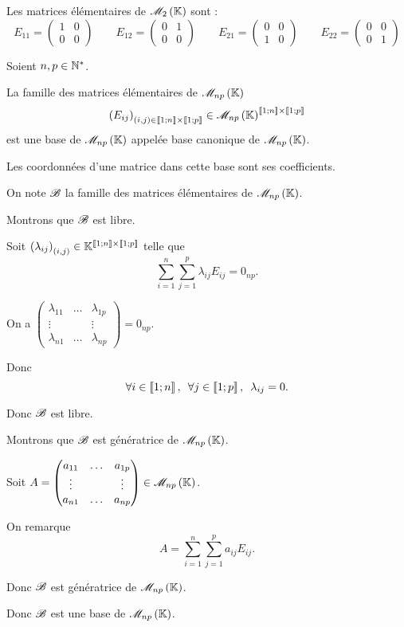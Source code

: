 \begin{ex}
Les matrices élémentaires de \(\M{2}\) sont : \[E_{11}=\begin{pmatrix}
1 & 0 \\
0 & 0
\end{pmatrix}\qquad E_{12}=\begin{pmatrix}
0 & 1 \\
0 & 0
\end{pmatrix}\qquad E_{21}=\begin{pmatrix}
0 & 0 \\
1 & 0
\end{pmatrix}\qquad E_{22}=\begin{pmatrix}
0 & 0 \\
0 & 1
\end{pmatrix}\]
\end{ex}

\begin{prop}
Soient \(n,p\in\mathbb{N}^*\).

La famille des matrices élémentaires de \(\M{np}\) \[\paren{E_{ij}}_{\paren{i,j}\in\interventierii{1}{n}\times\interventierii{1}{p}}\in\M{np}^{\interventierii{1}{n}\times\interventierii{1}{p}}\] est une base de \(\M{np}\) appelée base canonique de \(\M{np}\).

Les coordonnées d'une matrice dans cette base sont ses coefficients.
\end{prop}

\begin{dem}
On note \(\mathscr{B}\) la famille des matrices élémentaires de \(\M{np}\).

Montrons que \(\mathscr{B}\) est libre.

Soit \(\left(\lambda_{ij}\right)_{\left(i,j\right)}\in\mathbb{K}^{\left\llbracket1;n\right\rrbracket\times\left\llbracket1;p\right\rrbracket}\) telle que \[\sum_{i=1}^n\sum_{j=1}^p\lambda_{ij}E_{ij}=0_{np}.\]

On a \(\begin{pmatrix}
\lambda_{11} & \dots & \lambda_{1p} \\
\vdots &  & \vdots \\
\lambda_{n1} & \dots & \lambda_{np}
\end{pmatrix}=0_{np}\).

Donc \[\quantifs{\forall i\in\interventierii{1}{n};\forall j\in\interventierii{1}{p}}\lambda_{ij}=0.\]

Donc \(\mathscr{B}\) est libre.

Montrons que \(\mathscr{B}\) est génératrice de \(\M{np}\).

Soit \(A=\begin{pmatrix}
a_{11} & \dots & a_{1p} \\
\vdots &  & \vdots \\
a_{n1} & \dots & a_{np}
\end{pmatrix}\in\M{np}\).

On remarque \[A=\sum_{i=1}^n\sum_{j=1}^pa_{ij}E_{ij}.\]

Donc \(\mathscr{B}\) est génératrice de \(\M{np}\).

Donc \(\mathscr{B}\) est une base de \(\M{np}\).
\end{dem}

